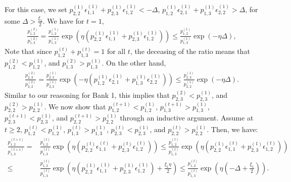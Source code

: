 For this case, we set $p^{(1)}_{2,2}\epsilon^{(1)}_{1,1}+p^{(1)}_{2,3}\epsilon^{(1)}_{1,2}<-\Delta$,  $p^{(1)}_{1,2}\epsilon^{(1)}_{2,1}+p^{(1)}_{1,3}\epsilon^{(1)}_{2,2}>\Delta$, for some $\Delta>\frac{\xi_1}{2}$. We have for $t=1$,  
\begin{equation*}
    \begin{split}
\frac{p^{(2)}_{1,2}}{p^{(2)}_{1,3}} = \frac{p^{(1)}_{1,2}}{p^{(1)}_{1,3}}\exp\left(\eta\left(p^{(1)}_{2,2}\epsilon^{(1)}_{1,1} + p^{(1)}_{2,3}\epsilon^{(1)}_{1,2}\right)\right) \leq   \frac{p^{(1)}_{1,2}}{p^{(1)}_{1,3}}\exp(-\eta\Delta),
    \end{split}
\end{equation*}
Note that since $p^{(t)}_{1,2}+p^{(t)}_{1,3}=1$ for all $t$, the deceasing of the ratio means that $p^{(2)}_{1,2}< p^{(1)}_{1,2}$, and $p^{(2)}_{1,3}> p^{(1)}_{1,3}$. On the other hand, 
\begin{equation*}
    \begin{split}
\frac{p^{(2)}_{2,3}}{p^{(2)}_{2,2}} = \frac{p^{(1)}_{2,3}}{p^{(1)}_{2,2}}\exp\left(-\eta\left(p^{(1)}_{1,2}\epsilon^{(1)}_{2,1} + p^{(1)}_{1,3}\epsilon^{(1)}_{2,2}\right)\right) \leq   \frac{p^{(1)}_{2,3}}{p^{(1)}_{2,2}}\exp(-\eta \Delta). 
    \end{split}
\end{equation*}
Similar to our reasoning for Bank 1, this implies that $p^{(2)}_{2,3}<p^{(1)}_{2,3}$, and $p^{(2)}_{2,2}>p^{(1)}_{2,2}$. 
We now show that $p^{(t+1)}_{1,2}< p^{(1)}_{1,2}$,  $p^{(t+1)}_{1,3}> p^{(1)}_{1,3}$, $p^{(t+1)}_{2,3}<p^{(1)}_{2,3}$, and $p^{(t+1)}_{2,2}>p^{(1)}_{2,2}$ through an inductive argument.
Assume at $t\geq 2$, $p^{(t)}_{1,2}< p^{(1)}_{1,2}$,  $p^{(t)}_{1,3}> p^{(1)}_{1,3}$, $p^{(t)}_{2,3}<p^{(1)}_{2,3}$, and $p^{(t)}_{2,2}>p^{(1)}_{2,2}$.
Then, we have:
\begin{equation*}
    \begin{split}
       \frac{p^{(t+1)}_{1,2}}{p^{(t+1)}_{1,3}} = {} & \frac{p^{(t)}_{1,2}}{p^{(t)}_{1,3}}\exp\left(\eta\left(p^{(t)}_{2,2}\epsilon^{(t)}_{1,1} + p^{(t)}_{2,3}\epsilon^{(t)}_{1,2}\right)\right) \leq \frac{p^{(t)}_{1,2}}{p^{(t)}_{1,3}}\exp\left(\eta\left(p^{(1)}_{2,2}\epsilon^{(t)}_{1,1} + p^{(1)}_{2,3}\epsilon^{(t)}_{1,2}\right)\right)\\
       \leq {} & \frac{p^{(t)}_{1,2}}{p^{(t)}_{1,3}}\exp\left(\eta\left(p^{(1)}_{2,2}\epsilon^{(1)}_{1,1} + p^{(1)}_{2,3}\epsilon^{(1)}_{1,2}\right)+\frac{\xi_1\eta}{2}\right) \leq \frac{p^{(t)}_{1,2}}{p^{(t)}_{1,3}}\exp\left(\eta\left(-\Delta+\frac{\xi_1}{2}\right)\right).
    \end{split}
\end{equation*}
